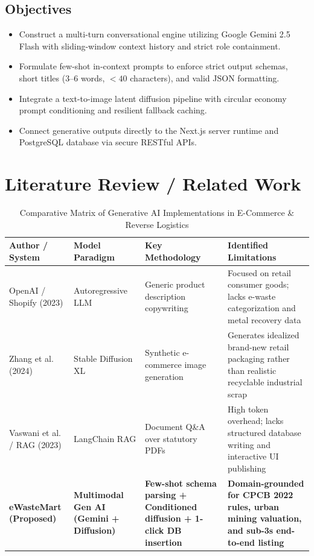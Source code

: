 \documentclass[12pt,a4paper]{article}
\begin{document}
\subsection{Objectives}
\begin{itemize}
    \item Construct a multi-turn conversational engine utilizing Google Gemini 2.5 Flash with sliding-window context history and strict role containment.
    \item Formulate few-shot in-context prompts to enforce strict output schemas, short titles ($3\text{--}6$ words, $<40$ characters), and valid JSON formatting.
    \item Integrate a text-to-image latent diffusion pipeline with circular economy prompt conditioning and resilient fallback caching.
    \item Connect generative outputs directly to the Next.js server runtime and PostgreSQL database via secure RESTful APIs.
\end{itemize}

\section{Literature Review / Related Work}

\begin{table}[H]
\centering
\caption{Comparative Matrix of Generative AI Implementations in E-Commerce \& Reverse Logistics}
\label{tab:lit_review}
\small
\begin{tabularx}{\textwidth}{p{3.2cm} p{2.8cm} p{4.2cm} p{4cm}}
\toprule
\textbf{Author / System} & \textbf{Model Paradigm} & \textbf{Key Methodology} & \textbf{Identified Limitations} \\
\midrule
OpenAI / Shopify (2023) & Autoregressive LLM & Generic product description copywriting & Focused on retail consumer goods; lacks e-waste categorization and metal recovery data \\
Zhang et al. (2024) & Stable Diffusion XL & Synthetic e-commerce image generation & Generates idealized brand-new retail packaging rather than realistic recyclable industrial scrap \\
Vaswani et al. / RAG (2023) & LangChain RAG & Document Q\&A over statutory PDFs & High token overhead; lacks structured database writing and interactive UI publishing \\
\textbf{eWasteMart (Proposed)} & \textbf{Multimodal Gen AI (Gemini + Diffusion)} & \textbf{Few-shot schema parsing + Conditioned diffusion + 1-click DB insertion} & \textbf{Domain-grounded for CPCB 2022 rules, urban mining valuation, and sub-3s end-to-end listing} \\
\bottomrule
\end{tabularx}
\end{table}
\end{document}
